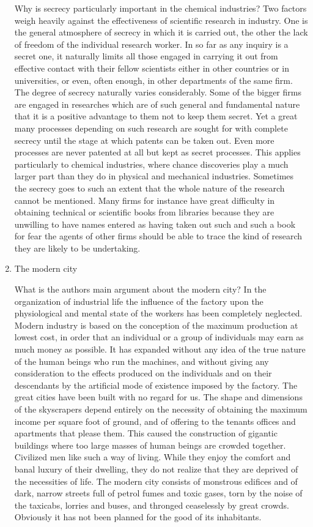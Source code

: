 \begin{enumerate}
Why is secrecy particularly important in the chemical industries? Two factors weigh heavily against the effectiveness of scientific research in industry.
One is the general atmosphere of secrecy in which it is carried out, the other the lack of freedom of the individual research worker.
In so far as any inquiry is a secret one, it naturally limits all those engaged in carrying it out from effective contact with their fellow scientists either in other countries or in universities, or even, often enough, in other departments of the same firm.
The degree of secrecy naturally varies considerably.
Some of the bigger firms are engaged in researches which are of such general and fundamental nature that it is a positive advantage to them not to keep them secret.
Yet a great many processes depending on such research are sought for with complete secrecy until the stage at which patents can be taken out.
Even more processes are never patented at all but kept as secret processes.
This applies particularly to chemical industries, where chance discoveries play a much larger part than they do in physical and mechanical industries.
Sometimes the secrecy goes to such an extent that the whole nature of the research cannot be mentioned.
Many firms for instance have great difficulty in obtaining technical or scientific books from libraries because they are unwilling to have names entered as having taken out such and such a book for fear the agents of other firms should be able to trace the kind of research they are likely to be undertaking.


\item The modern city

What is the authors main argument about the modern city? In the organization of industrial life the influence of the factory upon the physiological and mental state of the workers has been completely neglected.
Modern industry is based on the conception of the maximum production at lowest cost, in order that an individual or a group of individuals may earn as much money as possible.
It has expanded without any idea of the true nature of the human beings who run the machines, and without giving any consideration to the effects produced on the individuals and on their descendants by the artificial mode of existence imposed by the factory.
The great cities have been built with no regard for us.
The shape and dimensions of the skyscrapers depend entirely on the necessity of obtaining the maximum income per square foot of ground, and of offering to the tenants offices and apartments that please them.
This caused the construction of gigantic buildings where too large masses of human beings are crowded together.
Civilized men like such a way of living.
While they enjoy the comfort and banal luxury of their dwelling, they do not realize that they are deprived of the necessities of life.
The modern city consists of monstrous edifices and of dark, narrow streets full of petrol fumes and toxic gases, torn by the noise of the taxicabs, lorries and buses, and thronged ceaselessly by great crowds.
Obviously it has not been planned for the good of its inhabitants.



\end{enumerate}
